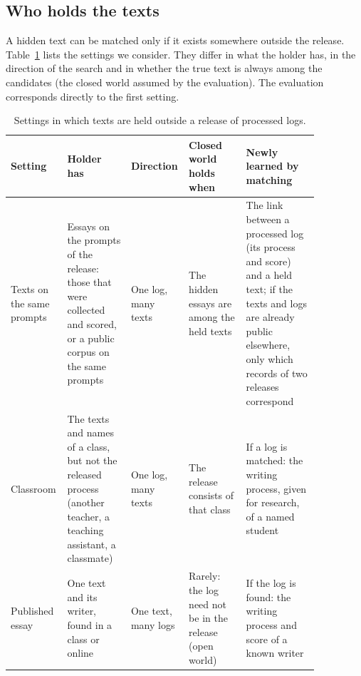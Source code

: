 \subsection{Who holds the texts}
\label{sec:threat-model:settings}

A hidden text can be matched only if it exists somewhere outside the release. Table~\ref{tab:settings} lists the
settings we consider. They differ in what the holder has, in the direction of the search and in whether the true text
is always among the candidates (the closed world assumed by the evaluation). The evaluation corresponds directly to the
first setting.

\begin{table}
  \caption{Settings in which texts are held outside a release of processed logs.}
  \label{tab:settings}
  \small
  \begin{tabular}{>{\raggedright\arraybackslash}p{0.14\linewidth}>{\raggedright\arraybackslash}p{0.2\linewidth}>{\raggedright\arraybackslash}p{0.11\linewidth}>{\raggedright\arraybackslash}p{0.18\linewidth}>{\raggedright\arraybackslash}p{0.23\linewidth}}
    \toprule
    Setting & Holder has & Direction & Closed world holds when & Newly learned by matching \\
    \midrule
    Texts on the same prompts & Essays on the prompts of the release: those that were collected and scored, or a
      public corpus on the same prompts & One log, many texts & The hidden essays are among the held texts & The link
      between a processed log (its process and score) and a held text; if the texts and logs are already public
      elsewhere, only which records of two releases correspond \\
    Classroom & The texts and names of a class, but not the released process (another teacher, a teaching
      assistant, a classmate) & One log, many texts & The release consists of that class & If a log is matched:
      the writing process, given for research, of a named student \\
    Published essay & One text and its writer, found in a class or online & One text, many logs & Rarely: the log need
      not be in the release (open world) & If the log is found: the writing process and score of a known
      writer \\
    \bottomrule
  \end{tabular}
\end{table}

